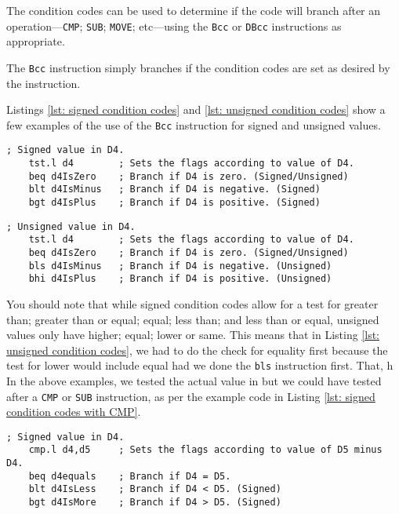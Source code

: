 The condition codes can be used to determine if the code will branch after an operation---\texttt{CMP}; \texttt{SUB}; \texttt{MOVE}; etc---using the \texttt{Bcc} or \texttt{DBcc} instructions as appropriate.

The \texttt{Bcc} instruction simply branches if the condition codes are set as desired by the instruction.

Listings \ref{lst: signed condition codes} and \ref{lst: unsigned condition codes} show a few examples of the use of the \texttt{Bcc} instruction for signed and unsigned values.

\begin{lstlisting}[caption={Signed condition codes},label={lst: signed condition codes}]
    ; Signed value in D4.
    tst.l d4        ; Sets the flags according to value of D4.
    beq d4IsZero    ; Branch if D4 is zero. (Signed/Unsigned)
    blt d4IsMinus   ; Branch if D4 is negative. (Signed)
    bgt d4IsPlus    ; Branch if D4 is positive. (Signed)
\end{lstlisting}    

\begin{lstlisting}[caption={Unsigned condition codes},label={lst: unsigned condition codes}]
    ; Unsigned value in D4.
    tst.l d4        ; Sets the flags according to value of D4.
    beq d4IsZero    ; Branch if D4 is zero. (Signed/Unsigned)
    bls d4IsMinus   ; Branch if D4 is negative. (Unsigned)
    bhi d4IsPlus    ; Branch if D4 is positive. (Unsigned)
\end{lstlisting}

You should note that while signed condition codes allow for a test for greater than; greater than or equal; equal; less than; and less than or equal, unsigned values only have higher; equal; lower or same. This means that in Listing \ref{lst: unsigned condition codes}, we had to do the check for equality first because the test for lower would include equal had we done the \texttt{bls} instruction first.
That, h
In the above examples, we tested the actual value in  but we could have tested after a \texttt{CMP} or \texttt{SUB} instruction, as per the example code in Listing \ref{lst: signed condition codes with CMP}.

\begin{lstlisting}[caption={Signed condition codes with CMP},label={lst: signed condition codes with CMP}]
    ; Signed value in D4.
    cmp.l d4,d5     ; Sets the flags according to value of D5 minus D4.
    beq d4equals    ; Branch if D4 = D5.
    blt d4IsLess    ; Branch if D4 < D5. (Signed)
    bgt d4IsMore    ; Branch if D4 > D5. (Signed)
\end{lstlisting}  

